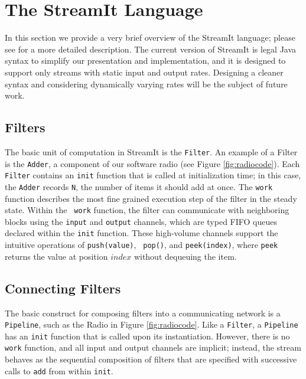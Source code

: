 \documentclass{sig-alternate}
\begin{document}
\section{The StreamIt Language}

In this section we provide a very brief overview of the StreamIt
language; please see \cite{streamittech} for a more detailed
description.  The current version of StreamIt is legal Java syntax to
simplify our presentation and implementation, and it is designed to
support only streams with static input and output rates.  Designing a
cleaner syntax and considering dynamically varying rates will be the
subject of future work.

\subsection{Filters}

The basic unit of computation in StreamIt is the {\tt Filter}.  An
example of a Filter is the {\tt Adder}, a component of our software
radio (see Figure \ref{fig:radiocode}).  Each {\tt Filter} contains an
{\tt init} function that is called at initialization time; in this
case, the {\tt Adder} records {\tt N}, the number of items it should
add at once.  The {\tt work} function describes the most fine grained
execution step of the filter in the steady state.  Within the {\tt
work} function, the filter can communicate with neighboring blocks
using the {\tt input} and {\tt output} channels, which are typed FIFO
queues declared within the {\tt init} function.  These high-volume
channels support the intuitive operations of {\tt push(value)}, {\tt
pop()}, and {\tt peek(index)}, where {\tt peek} returns the value at
position $index$ without dequeuing the item.

\subsection{Connecting Filters}
\label{sec:connecting}

The basic construct for composing filters into a communicating network
is a {\tt Pipeline}, such as the Radio in Figure \ref{fig:radiocode}.
Like a {\tt Filter}, a {\tt Pipeline} has an {\tt init} function that
is called upon its instantiation.  However, there is no {\tt work}
function, and all input and output channels are implicit; instead, the
stream behaves as the sequential composition of filters that are
specified with successive calls to {\tt add} from within {\tt init}.
\end{document}
